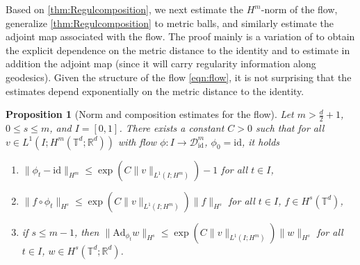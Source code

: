 \documentclass[a4paper, 12pt]{article}
\newtheorem{proposition}[theorem]{Proposition}
\newcommand{\R}{\mathbb{R}}
\newcommand{\T}{\mathbb{T}}
\newcommand{\id}{\mathrm{id}}
\newcommand{\DiffSobId}{\mathcal D_{\id}}
\newcommand{\adjointMap}{\mathrm{Ad}}
\begin{document}
Based on \cref{thm:Regulcomposition}, we next estimate the $H^m$-norm of the flow, %
generalize \cref{thm:Regulcomposition} to metric balls, and similarly estimate the adjoint map associated with the flow.
The proof mainly is a variation of \cite[Lemma 3.5]{BrVi17} to obtain the explicit dependence on the metric distance to the identity
and to estimate in addition the adjoint map (since it will carry regularity information along geodesics).
Given the structure of the flow \eqref{eqn:flow}, it is not surprising that the estimates depend exponentially on the metric distance to the identity.

\begin{proposition}[Norm and composition estimates for the flow]\label{thm:normEstDeform}
Let $m>\frac{d}{2}+1$, $0\leq s\leq m$, and $I=[0,1]$.
There exists a constant $C>0$ such that for all $v\in L^1(I;H^m(\T^d;\R^d))$ with flow $\phi:I\to\DiffSobId^m$, $\phi_0=\id$, it holds
\begin{enumerate}
\item
$\|\phi_t-\id\|_{H^m}\leq\exp(C\|v\|_{L^1(I;H^m)})-1$ for all $t\in I$,
\item\label{enm:composition}
$\|f\circ\phi_t\|_{H^s}\leq\exp(C\|v\|_{L^1(I;H^m)})\|f\|_{H^s}$ for all $t\in I$, $f\in H^s(\T^d)$,
\item\label{enm:adjointMapEstimate}
if $s\leq m-1$, then $\|\adjointMap_{\phi_t}w\|_{H^s}\leq\exp(C\|v\|_{L^1(I;H^m)})\|w\|_{H^s}$ for all $t\in I$, $w\in H^s(\T^d;\R^d)$.
\end{enumerate}
\end{proposition}
\end{document}
